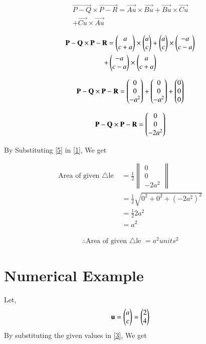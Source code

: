 \documentclass[journal,12pt,twocolumn]{IEEEtran}
\renewcommand\thesection{\arabic{section}}
\begin{document}
\begin{enumerate}[label=\thesection.\arabic*.,ref=\thesection.\theenumi]
\begin{multline}
\Vec{P-Q}\times\Vec{P-R}=\vec{Au}\times\vec{Bu}+\vec{Bu}\times\vec{Cu}\\+\vec{Cu}\times\vec{Au}
\end{multline}

\begin{multline}
\Vec{P-Q}\times \Vec{P-R}=\myvec{a\\c+a}\times\myvec{a\\c}+\myvec{a\\c}\times\myvec{-a\\c-a}\\+\myvec{-a\\c-a}\times\myvec{a\\c+a}
\end{multline}

\begin{multline}
\Vec{P-Q}\times  \Vec{P-R}=\myvec{0\\0\\-a^2}+\myvec{0\\0\\-a^2}+\myvec{0\\0\\0}
\end{multline}

\begin{multline}
\Vec{P-Q}\times  \Vec{P-R}=\myvec{0\\0\\-2a^2}
\label{5}
\end{multline}

By Substituting \eqref{5} in \eqref{1}, We get

\begin{align}
\text{Area of given $\triangle$le }&=\frac{1}{2}\begin{Vmatrix}
0\\0\\-2a^2
\end{Vmatrix}\\
&= \frac{1}{2}\sqrt{0^2 + 0^2+ (-2a^2)^2}\\
&= \frac{1}{2} 2a^2\\
&=a^2
\end{align}

\begin{align}
\boxed{\therefore \text{Area of given $\triangle$le }=a^2 units^2}
\label{4}
\end{align}

\section{Numerical Example}
Let,
\begin{align}
\mathbf{u}=\begin{pmatrix}a\\c\end{pmatrix}=\begin{pmatrix}2\\4\end{pmatrix}
\end{align}
\solution
By substituting the given values in \eqref{3}, We get


\end{enumerate}
\end{document}
